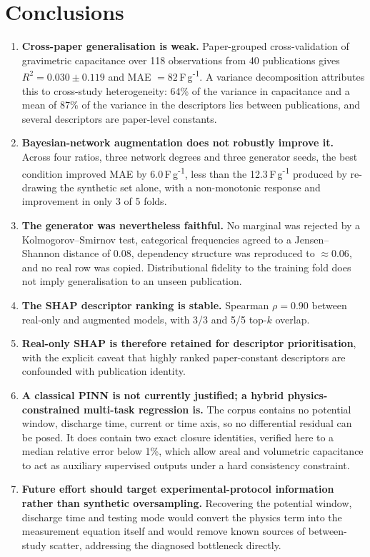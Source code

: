 \section{Conclusions}\label{sec:conclusion}

\begin{enumerate}
\item \textbf{Cross-paper generalisation is weak.} Paper-grouped cross-validation of
gravimetric capacitance over 118 observations from 40 publications gives
$R^2 = 0.030 \pm 0.119$ and MAE
$= 82$\,F\,g\textsuperscript{-1}. A variance decomposition attributes
this to cross-study heterogeneity: 64\% of the variance in capacitance and a mean of
87\% of the variance in the descriptors lies between
publications, and several descriptors are paper-level constants.

\item \textbf{Bayesian-network augmentation does not robustly improve it.} Across four
ratios, three network degrees and three generator seeds, the best condition improved MAE by
6.0\,F\,g\textsuperscript{-1}, less than the
12.3\,F\,g\textsuperscript{-1} produced by re-drawing the synthetic set alone, with
a non-monotonic response and improvement in only 3 of
5 folds.

\item \textbf{The generator was nevertheless faithful.} No marginal was rejected by a
Kolmogorov--Smirnov test, categorical frequencies agreed to a Jensen--Shannon distance of
0.08, dependency structure was reproduced to
$\approx0.06$, and no real row was copied. Distributional
fidelity to the training fold does not imply generalisation to an unseen publication.

\item \textbf{The SHAP descriptor ranking is stable.} Spearman
$\rho = 0.90$ between real-only and augmented models, with
3/3 and 5/5 top-$k$ overlap.

\item \textbf{Real-only SHAP is therefore retained for descriptor prioritisation}, with the
explicit caveat that highly ranked paper-constant descriptors are confounded with publication
identity.

\item \textbf{A classical PINN is not currently justified; a hybrid physics-constrained
multi-task regression is.} The corpus contains no potential window, discharge time, current
or time axis, so no differential residual can be posed. It does contain two exact closure
identities, verified here to a median relative error below 1\%, which allow areal and
volumetric capacitance to act as auxiliary supervised outputs under a hard consistency
constraint.

\item \textbf{Future effort should target experimental-protocol information rather than
synthetic oversampling.} Recovering the potential window, discharge time and testing mode
would convert the physics term into the measurement equation itself and would remove known
sources of between-study scatter, addressing the diagnosed bottleneck directly.
\end{enumerate}
